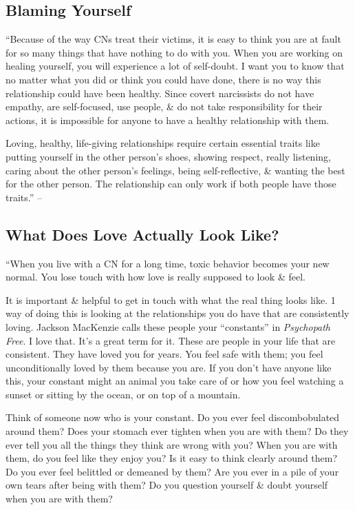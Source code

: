 \documentclass{article}
\numberwithin{equation}{section}
\begin{document}
\subsection{Blaming Yourself}
``Because of the way CNs treat their victims, it is easy to think you are at fault for so many things that have nothing to do with you. When you are working on healing yourself, you will experience a lot of self-doubt. I want you to know that no matter what you did or think you could have done, there is no way this relationship could have been healthy. Since covert narcissists do not have empathy, are self-focused, use people, \& do not take responsibility for their actions, it is impossible for anyone to have a healthy relationship with them.

Loving, healthy, life-giving relationships require certain essential traits like putting yourself in the other person's shoes, showing respect, really listening, caring about the other person's feelings, being self-reflective, \& wanting the best for the other person. The relationship can only work if both people have those traits.'' -- \cite[p. 156]{Mirza2017}

\subsection{What Does Love Actually Look Like?}
``When you live with a CN for a long time, toxic behavior becomes your new normal. You lose touch with how love is really supposed to look \& feel.

It is important \& helpful to get in touch with what the real thing looks like. 1 way of doing this is looking at the relationships you do have that are consistently loving. Jackson MacKenzie calls these people your ``constants'' in \textit{Psychopath Free}. I love that. It's a great term for it. These are people in your life that are consistent. They have loved you for years. You feel safe with them; you feel unconditionally loved by them because you are. If you don't have anyone like this, your constant might an animal you take care of or how you feel watching a sunset or sitting by the ocean, or on top of a mountain.

Think of someone now who is your constant. Do you ever feel discombobulated around them? Does your stomach ever tighten when you are with them? Do they ever tell you all the things they think are wrong with you? When you are with them, do you feel like they enjoy you? Is it easy to think clearly around them? Do you ever feel belittled or demeaned by them? Are you ever in a pile of your own tears after being with them? Do you question yourself \& doubt yourself when you are with them?
\end{document}

